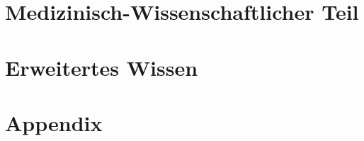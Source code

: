 \documentclass[
ngerman,
paper=a4,
asymmetric,
fontsize=9pt,
headings=small,
draft=false,
parskip=false,
footnotes=multiple,
]{scrbook}
\begin{document}










\setcounter{chapter}{20}
\setcounter{page}{0}

\part{Medizinisch-Wissenschaftlicher Teil}










 









% 

\setcounter{chapter}{40}
\setcounter{page}{0}
\part{Erweitertes Wissen}






% 





\appendix
\setcounter{page}{0}
\part{Appendix}






\end{document}
